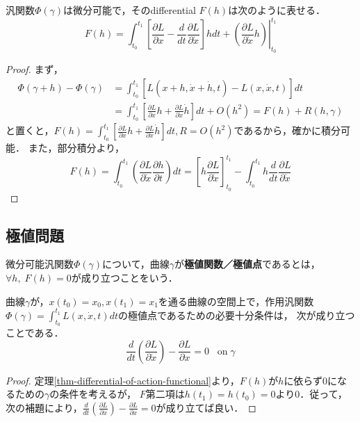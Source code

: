 \documentclass[uplatex, 12pt, dvipdfmx]{jsreport}
\begin{document}
\begin{theorem}\label{thm-differential-of-action-functional}
    汎関数$\Phi(\gamma)$は微分可能で，そのdifferential $F(h)$は次のように表せる．
    \[ F(h) = \int^{t_1}_{t_0}\left.\left[ \frac{\partial L}{\partial x}-\frac{d}{dt}\frac{\partial L}{\partial\dot{x}} \right]hdt+\left(\frac{\partial L}{\partial\dot{x}}h\right) \right|^{t_1}_{t_0} \]
\end{theorem}
\begin{proof}
    まず，
    \begin{align*}
        \Phi(\gamma+h)-\Phi(\gamma) &= \int^{t_1}_{t_0}\left[L(x+h,\dot{x}+\dot{h},t)-L(x,\dot{x},t)\right]dt\\
        &= \int^{t_1}_{t_0}\left[\frac{\partial L}{\partial x}h+\frac{\partial L}{\partial\dot{x}}\dot{h}\right]dt + O(h^2) = F(h) + R(h,\gamma)
    \end{align*}
    と置くと，$F(h)=\int^{t_1}_{t_0}\left[\frac{\partial L}{\partial x}h+\frac{\partial L}{\partial\dot{x}}\dot{h}\right]dt, R=O(h^2)$であるから，確かに積分可能．
    また，部分積分より，
    \[ F(h) = \int^{t_1}_{t_0}\left( \frac{\partial L}{\partial\dot{x}}\frac{\partial h}{\partial t} \right)dt = \left[ h\frac{\partial L}{\partial\dot{x}} \right]^{t_1}_{t_0} - \int^{t_1}_{t_0} h\frac{d}{dt}\frac{\partial L}{\partial\dot{x}} \]
\end{proof}

\subsection{極値問題}

\begin{definition}[extremal]
    微分可能汎関数$\Phi(\gamma)$について，曲線$\gamma$が\textbf{極値関数／極値点}であるとは，$\forall h,\; F(h)=0$が成り立つことをいう．
\end{definition}

\begin{theorem}\label{thm-EL-equation}
    曲線$\gamma$が，$x(t_0)=x_0,x(t_1)=x_1$を通る曲線の空間上で，作用汎関数$\Phi(\gamma)=\int^{t_1}_{t_0}L(x,\dot{x},t)dt$の極値点であるための必要十分条件は，
    次が成り立つことである．
    \[ \frac{d}{dt}\left(\frac{\partial L}{\partial\dot{x}}\right) - \frac{\partial L}{\partial x} = 0\;\;\;\mathrm{on\;}\gamma \]
\end{theorem}
\begin{proof}
    定理\ref{thm-differential-of-action-functional}より，$F(h)$が$h$に依らず$0$になるための$\gamma$の条件を考えるが，
    $F$第二項は$h(t_1)=h(t_0)=0$より$0$．従って，次の補題により，$\frac{d}{dt}\left(\frac{\partial L}{\partial\dot{x}}\right) - \frac{\partial L}{\partial x} = 0$が成り立てば良い．
\end{proof}
\end{document}
